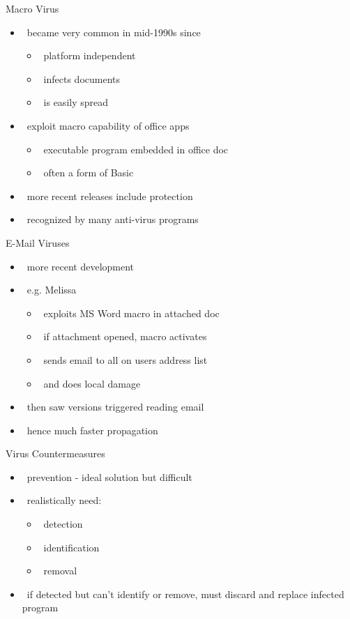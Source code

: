 \documentclass{beamer}
\begin{document}
\begin{frame}{Macro Virus }
  \begin{itemize}
  \item  became very common in mid-1990s since 
    \begin{itemize}
    \item  platform independent 
    \item  infects documents 
    \item  is easily spread 
    \end{itemize}
  \item  exploit macro capability of office apps 
    \begin{itemize}
    \item  executable program embedded in office doc 
    \item  often a form of Basic 
    \end{itemize}
  \item  more recent releases include protection 
  \item  recognized by many anti-virus programs 
  \end{itemize}
\end{frame}

\begin{frame}{E-Mail Viruses }
  \begin{itemize}
  \item  more recent development 
  \item  e.g. Melissa 
    \begin{itemize}
    \item  exploits MS Word macro in attached doc 
    \item  if attachment opened, macro activates 
    \item  sends email to all on users address list 
    \item  and does local damage 
    \end{itemize}
  \item  then saw versions triggered reading email 
  \item  hence much faster propagation
  \end{itemize}
\end{frame}

\begin{frame}{Virus Countermeasures}
  \begin{itemize}
  \item  prevention - ideal solution but difficult 
  \item  realistically need: 
    \begin{itemize}
    \item  detection 
    \item  identification 
    \item  removal 
    \end{itemize}
  \item  if detected but can't identify or remove, must 
    discard and replace infected program
  \end{itemize}
\end{frame}
\end{document}

